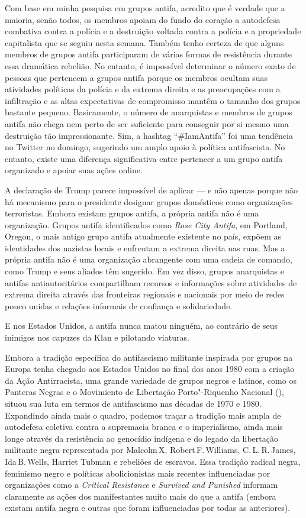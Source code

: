 Com base em minha pesquisa em grupos antifa, acredito que é verdade que a maioria, senão todos, os membros apoiam do fundo do coração a autodefesa combativa contra a polícia e a destruição voltada contra a polícia e a propriedade capitalista que se seguiu nesta semana. Também tenho certeza de que alguns membros de grupos antifa participaram de várias formas de resistência durante essa dramática rebelião. No entanto, é impossível determinar o número exato de pessoas que pertencem a grupos antifa porque os membros ocultam suas atividades políticas da polícia e da extrema direita e as preocupações com a infiltração e as altas expectativas de compromisso mantêm o tamanho dos grupos bastante pequeno. Basicamente, o número de anarquistas e membros de grupos antifa não chega nem perto de ser suficiente para conseguir por si mesmo uma destruição tão impressionante. Sim, a hashtag ``\#IamAntifa'' foi uma tendência no Twitter no domingo, sugerindo um amplo apoio à política antifascista. No entanto, existe uma diferença significativa entre pertencer a um grupo antifa organizado e apoiar suas ações online.

A declaração de Trump parece impossível de aplicar — e não apenas porque não há mecanismo para o presidente designar grupos domésticos como organizações terroristas. Embora existam grupos antifa, a própria antifa não é uma organização. Grupos antifa identificados como \emph{Rose City Antifa}, em Portland, Oregon, o mais antigo grupo antifa atualmente existente no país, expõem as identidades dos nazistas locais e enfrentam a extrema direita nas ruas. Mas a própria antifa não é uma organização abrangente com uma cadeia de comando, como Trump e seus aliados têm sugerido. Em vez disso, grupos anarquistas e antifas antiautoritários compartilham recursos e informações sobre atividades de extrema direita através das fronteiras regionais e nacionais por meio de redes pouco unidas e relações informais de confiança e solidariedade.
 
E nos Estados Unidos, a antifa nunca matou ninguém, ao contrário de seus inimigos nos capuzes da Klan e pilotando viaturas.

Embora a tradição específica do antifascismo militante inspirada por grupos na Europa tenha chegado aos Estados Unidos no final dos anos 1980 com a criação da Ação Antirracista, uma grande variedade de grupos negros e latinos, como os Panteras Negras e o Movimiento de Libertação Porto"-Riquenho Nacional (), situou sua luta em termos de antifascismo nas décadas de 1970 e 1980. Expandindo ainda mais o quadro, podemos traçar a tradição mais ampla de autodefesa coletiva contra a supremacia branca e o imperialismo, ainda mais longe através da resistência ao genocídio indígena e do legado da libertação militante negra representada por Malcolm\,X, Robert\,F.\,Williams, C.\,L.\,R.\,James, Ida\,B.\,Wells, Harriet Tubman e rebeliões de escravos. Essa tradição radical negra, feminismo negro e políticas abolicionistas mais recentes influenciadas por organizações como a \emph{Critical Resistance} e \emph{Survived and Punished} informam claramente as ações dos manifestantes muito mais do que a antifa (embora existam antifa negra e outras que foram influenciadas por todas as anteriores).
 
